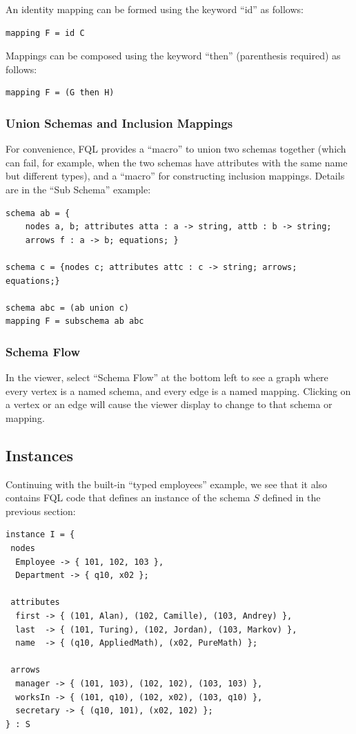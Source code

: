 \documentclass[12pt]{article}
\begin{document}
An identity mapping can be formed using the keyword ``id'' as follows:
\begin{verbatim}
mapping F = id C
\end{verbatim}
Mappings can be composed using the keyword ``then'' (parenthesis required) as follows:
\begin{verbatim}
mapping F = (G then H)
\end{verbatim}

\subsubsection{Union Schemas and Inclusion Mappings}
For convenience, FQL provides a ``macro'' to union two schemas together (which can fail, for example, when the two schemas have attributes with the same name but different types), and a ``macro'' for constructing inclusion mappings.  Details are in the ``Sub Schema'' example: 
\begin{verbatim}
schema ab = {
	nodes a, b; attributes atta : a -> string, attb : b -> string;
	arrows f : a -> b; equations; }

schema c = {nodes c; attributes attc : c -> string; arrows; equations;}

schema abc = (ab union c)
mapping F = subschema ab abc
\end{verbatim}

\subsubsection{Schema Flow}

In the viewer, select ``Schema Flow'' at the bottom left to see a graph where every vertex is a named schema, and every edge is a named mapping.  Clicking on a vertex or an edge will cause the viewer display to change to that schema or mapping.



\subsection{Instances}

Continuing with the built-in ``typed employees'' example, we see that it also contains FQL code that defines an instance of the schema $S$ defined in the previous section:

\begin{verbatim}
instance I = {
 nodes
  Employee -> { 101, 102, 103 },
  Department -> { q10, x02 };
  
 attributes
  first -> { (101, Alan), (102, Camille), (103, Andrey) },
  last  -> { (101, Turing), (102, Jordan), (103, Markov) },
  name  -> { (q10, AppliedMath), (x02, PureMath) };
  
 arrows
  manager -> { (101, 103), (102, 102), (103, 103) },
  worksIn -> { (101, q10), (102, x02), (103, q10) },
  secretary -> { (q10, 101), (x02, 102) };
} : S
\end{verbatim}
\end{document}
